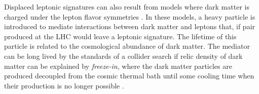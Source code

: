 Displaced leptonic signatures can also result from models where dark matter is charged under the lepton flavor symmetries \cite{Agrawal_2012}. In these models, a heavy particle is introduced to mediate interactions between dark matter and leptons that, if pair produced at the \ac{LHC} would leave a leptonic signature. The lifetime of this particle is related to the cosmological abundance of dark matter. The mediator can be long lived by the standards of a collider search if relic density of dark matter can be explained by \emph{freeze-in}, where the dark matter particles are produced decoupled from the cosmic thermal bath until some cooling time when their production is no longer possible \cite{Hall_2010}.




